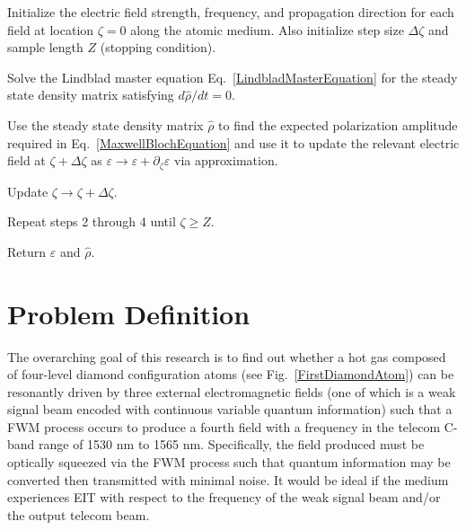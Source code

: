 \documentclass[aps,pra,showpacs,amsmath,amssymb,nofootinbib,longbibliography,superscriptaddress
]{revtex4-1}
\theoremstyle{definition}
\theoremstyle{remark}
\newcommand{\0}{\hat{0}}
\begin{document}
\begin{algorithm}[H]
    \caption{The Lindblad-Maxwell-Bloch Algorithm}
    \begin{algorithmic}[1]
        \State Initialize the electric field strength, frequency, and propagation direction for each field at location $\zeta=0$ along the atomic medium. Also initialize step size $\Delta \zeta$ and sample length $Z$ (stopping condition).

        \State Solve the Lindblad master equation Eq.~\eqref{LindbladMasterEquation} for the steady state density matrix satisfying $d\hat{\rho} / dt = 0$.
        
        \State Use the steady state density matrix $\hat \rho$ to find the expected polarization amplitude required in Eq.~\eqref{MaxwellBlochEquation} and use it to update the relevant electric field at $\zeta + \Delta \zeta$ as $\varepsilon \rightarrow \varepsilon + \partial_\zeta \varepsilon$ via approximation.

        \State Update $\zeta \rightarrow \zeta + \Delta \zeta$.

        \State Repeat steps 2 through 4 until $\zeta \geq Z$.

        \State Return $\varepsilon$ and $\hat \rho$.

    \end{algorithmic}
    \label{Alg}
\end{algorithm}


\section{Problem Definition}\label{ProblemDefinition}

The overarching goal of this research is to find out whether a hot gas composed of four-level diamond configuration atoms (see Fig.~\ref{FirstDiamondAtom}) can be resonantly driven by three external electromagnetic fields (one of which is a weak signal beam encoded with continuous variable quantum information) such that a FWM process occurs to produce a fourth field with a frequency in the telecom C-band range of 1530 nm to 1565 nm. Specifically, the field produced must be optically squeezed via the FWM process such that quantum information may be converted then transmitted with minimal noise. It would be ideal if the medium experiences EIT with respect to the frequency of the weak signal beam and/or the output telecom beam.
\end{document}
